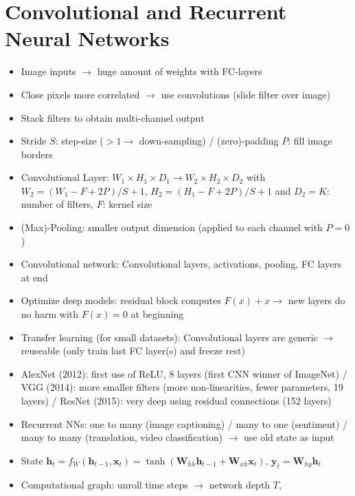 \documentclass[11pt]{scrartcl}
\begin{document}
\section{Convolutional and Recurrent Neural Networks}

\begin{itemize}
    \item Image inputs \( \rightarrow \) huge amount of weights with FC-layers
    \item Close pixels more correlated \( \rightarrow \) use convolutions (slide filter over 
        image)
    \item Stack filters to obtain multi-channel output
    \item Stride \( S \): step-size (\( > 1 \rightarrow \) down-sampling) / (zero)-padding 
        \( P \): fill image borders
    \item Convolutional Layer: \( W_1 \times H_1 \times D_1 
        \rightarrow W_2 \times H_2 \times D_2 \) with \( W_2 = ( W_1 - F + 2 P ) / S + 1 \), 
        \( H_2 = ( H_1 - F + 2 P ) / S + 1 \) and \( D_2 = K \): number of filters, \( F \): 
        kernel size
    \item (Max)-Pooling: smaller output dimension (applied to each channel with \( P = 0 \))
    \item Convolutional network: Convolutional layers, activations, pooling, FC layers at end
    \item Optimize deep models: residual block computes \( F ( x ) + x \rightarrow \) new 
        layers do no harm with \( F ( x ) = 0 \) at beginning
    \item Transfer learning (for small datasets): Convolutional layers are generic 
        \( \rightarrow \) reuseable (only train last FC layer(s) and freeze rest)
    \item AlexNet (2012): first use of ReLU, 8 layers (first CNN winner of ImageNet) / VGG 
        (2014): more smaller filters (more non-linearities, fewer parameters, 19 layers) / 
        ResNet (2015): very deep using residual connections (152 layers)
    \item Recurrent NNs: one to many (image captioning) / many to one (sentiment) 
        / many to many (translation, video classification) \( \rightarrow \) use old state as 
        input
    \item State \( \bm{h}_t = f_W ( \bm{h}_{t - 1}, \bm{x}_t ) = \tanh ( \bm{W}_{h h}  
        \bm{h}_{t - 1} + \bm{W}_{x h} \bm{x}_t ) \), \( \bm{y}_t = \bm{W}_{h y} \bm{h}_t \)
    \item Computational graph: unroll time steps \( \rightarrow \) network depth \( T \), 

\end{itemize}
\end{document}
